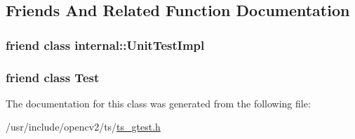 \subsection{Friends And Related Function Documentation}
\hypertarget{classtesting_1_1TestCase_acc0a5e7573fd6ae7ad1878613bb86853}{
\subsubsection[{internal\-::\-Unit\-Test\-Impl}]{\setlength{\rightskip}{0pt plus 5cm}friend class internal\-::\-Unit\-Test\-Impl\hspace{0.3cm}{\ttfamily [friend]}}}\label{classtesting_1_1TestCase_acc0a5e7573fd6ae7ad1878613bb86853}
\hypertarget{classtesting_1_1TestCase_a5b78b1c2e1fa07ffed92da365593eaa4}{
\subsubsection[{Test}]{\setlength{\rightskip}{0pt plus 5cm}friend class {\bf Test}\hspace{0.3cm}{\ttfamily [friend]}}}\label{classtesting_1_1TestCase_a5b78b1c2e1fa07ffed92da365593eaa4}


The documentation for this class was generated from the following file\-:\begin{DoxyCompactItemize}
\item 
/usr/include/opencv2/ts/\hyperlink{ts__gtest_8h}{ts\-\_\-gtest.\-h}\end{DoxyCompactItemize}

